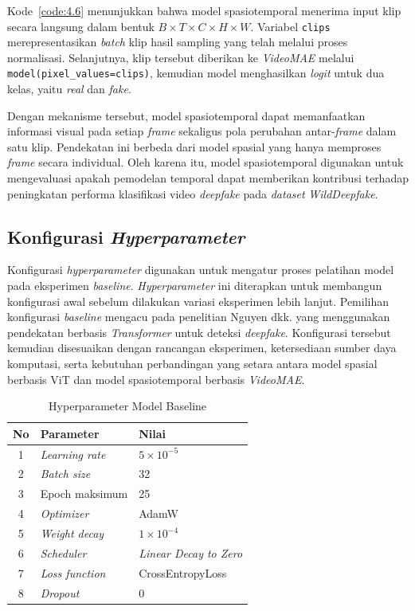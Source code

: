 Kode~\ref{code:4.6} menunjukkan bahwa model spasiotemporal menerima input klip secara langsung dalam bentuk $B \times T \times C \times H \times W$. Variabel \texttt{clips} merepresentasikan \textit{batch} klip hasil sampling yang telah melalui proses normalisasi. Selanjutnya, klip tersebut diberikan ke \textit{VideoMAE} melalui \texttt{model(pixel\_values=clips)}, kemudian model menghasilkan \textit{logit} untuk dua kelas, yaitu \textit{real} dan \textit{fake}.

Dengan mekanisme tersebut, model spasiotemporal dapat memanfaatkan informasi visual pada setiap \textit{frame} sekaligus pola perubahan antar-\textit{frame} dalam satu klip. Pendekatan ini berbeda dari model spasial yang hanya memproses \textit{frame} secara individual. Oleh karena itu, model spasiotemporal digunakan untuk mengevaluasi apakah pemodelan temporal dapat memberikan kontribusi terhadap peningkatan performa klasifikasi video \textit{deepfake} pada \textit{dataset} \textit{WildDeepfake}.

\subsection{Konfigurasi \textit{Hyperparameter}} \label{IV.Hyperparameter}
Konfigurasi \textit{hyperparameter} digunakan untuk mengatur proses pelatihan model pada eksperimen \textit{baseline}. \textit{Hyperparameter} ini diterapkan untuk membangun konfigurasi awal sebelum dilakukan variasi eksperimen lebih lanjut. Pemilihan konfigurasi \textit{baseline} mengacu pada penelitian Nguyen dkk. \cite{nguyen2024fakeformerefficientvulnerabilitydriventransformers} yang menggunakan pendekatan berbasis \textit{Transformer} untuk deteksi \textit{deepfake}. Konfigurasi tersebut kemudian disesuaikan dengan rancangan eksperimen, ketersediaan sumber daya komputasi, serta kebutuhan perbandingan yang setara antara model spasial berbasis ViT dan model spasiotemporal berbasis \textit{VideoMAE}.

\begin{table}[htbp]
	\centering
	\caption{Hyperparameter Model Baseline}
	\label{table:4.hyperparam}
	\begin{tabular}{cll}
		\toprule
		\textbf{No} & \textbf{Parameter} & \textbf{Nilai} \\
		\midrule
		1 & \textit{Learning rate} & $5\times10^{-5}$ \\
		2 & \textit{Batch size} & 32 \\
		3 & Epoch maksimum & 25 \\
		4 & \textit{Optimizer} & AdamW \\
		5 & \textit{Weight decay} & $1\times10^{-4}$ \\
		6 & \textit{Scheduler} & \textit{Linear Decay to Zero} \\
		7 & \textit{Loss function} & CrossEntropyLoss \\
		8 & \textit{Dropout} & 0 \\
		\bottomrule
	\end{tabular}
\end{table}

